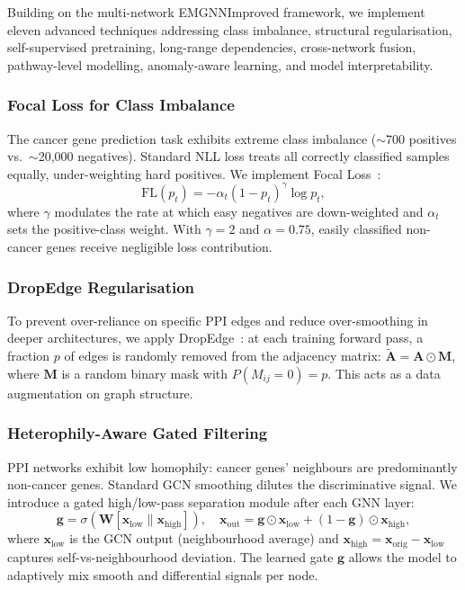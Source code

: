 Building on the multi-network EMGNNImproved framework, we implement eleven advanced
techniques addressing class imbalance, structural regularisation, self-supervised
pretraining, long-range dependencies, cross-network fusion, pathway-level modelling,
anomaly-aware learning, and model interpretability.

\subsubsection{Focal Loss for Class Imbalance}
The cancer gene prediction task exhibits extreme class imbalance ($\sim$700 positives
vs.\ $\sim$20{,}000 negatives). Standard NLL loss treats all correctly classified samples
equally, under-weighting hard positives. We implement Focal Loss~\cite{focal2017}:
\begin{equation}
  \text{FL}(p_t) = -\alpha_t (1 - p_t)^{\gamma} \log p_t,
  \label{eq:focal}
\end{equation}
where $\gamma$ modulates the rate at which easy negatives are down-weighted and
$\alpha_t$ sets the positive-class weight. With $\gamma = 2$ and $\alpha = 0.75$,
easily classified non-cancer genes receive negligible loss contribution.

\subsubsection{DropEdge Regularisation}
To prevent over-reliance on specific PPI edges and reduce over-smoothing in deeper
architectures, we apply DropEdge~\cite{dropedge2020}: at each training forward pass, a
fraction $p$ of edges is randomly removed from the adjacency matrix:
$\tilde{\mathbf{A}} = \mathbf{A} \odot \mathbf{M}$, where $\mathbf{M}$ is a random
binary mask with $P(M_{ij} = 0) = p$. This acts as a data augmentation on graph
structure.

\subsubsection{Heterophily-Aware Gated Filtering}
PPI networks exhibit low homophily: cancer genes' neighbours are predominantly non-cancer
genes. Standard GCN smoothing dilutes the discriminative signal. We introduce a gated
high/low-pass separation module after each GNN layer:
\begin{equation}
  \mathbf{g} = \sigma(\mathbf{W}[\mathbf{x}_{\text{low}} \| \mathbf{x}_{\text{high}}]),
  \quad \mathbf{x}_{\text{out}} = \mathbf{g} \odot \mathbf{x}_{\text{low}} +
  (1 - \mathbf{g}) \odot \mathbf{x}_{\text{high}},
  \label{eq:hlpass}
\end{equation}
where $\mathbf{x}_{\text{low}}$ is the GCN output (neighbourhood average) and
$\mathbf{x}_{\text{high}} = \mathbf{x}_{\text{orig}} - \mathbf{x}_{\text{low}}$ captures
self-vs-neighbourhood deviation. The learned gate $\mathbf{g}$ allows the model to
adaptively mix smooth and differential signals per node.

